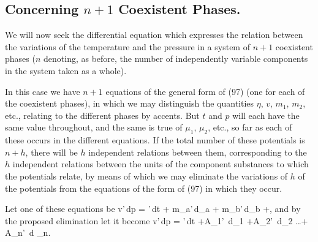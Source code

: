 \documentclass[12pt]{memoir}
\begin{document}
\subsection{Concerning $n +1$ Coexistent Phases.}
We will now seek the differential equation which expresses the relation between the variations of the temperature and the pressure in a system of $n + 1$ coexistent phases ($n$ denoting, as before, the number of independently variable components in the system taken as a whole).


In this case we have  $n+1$ equations of the general form of (97) (one for each of the coexistent phases), in which we may distinguish the quantities $\eta$, $v$, $m_1$, $m_2$, etc., relating to the different phases by accents. But $t$ and $p$ will each have the same value throughout, and the same is true of $\mu_1$, $\mu_2$, etc., so far as each of these occurs in the different equations. If the total number of these potentials is $n+h$, there will be $h$ independent relations between them, corresponding to the $h$ independent relations between the units of the component substances to which the potentials relate, by means of which we may eliminate the variations of $h$ of the potentials from the equations of the form of (97) in which they occur.


Let one of these equations be
\eqs v'\,dp = \eta'\,dt + m_a'\,d\mu_a + m_b'\,d\mu_b +, \label{124}\eqe
and by the proposed elimination let it become
\eqs v'\,dp = \eta'\,dt +A_1' \,d\mu_1 +A_2' \,d\mu_2  \dots + A_n' \,d \mu_n.\label{125}\eqe
\end{document}
